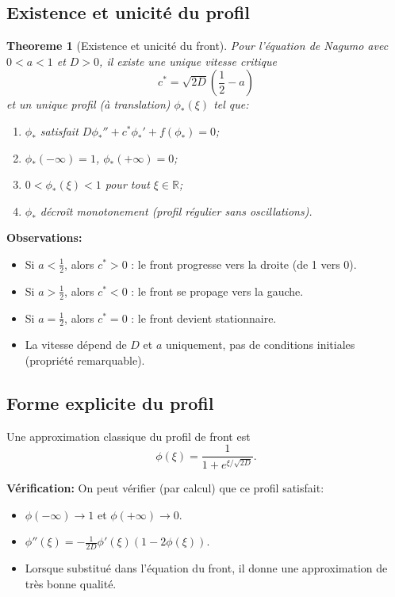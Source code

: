 \documentclass[11pt,a4paper]{report}
\newtheorem{theorem}{Theoreme}[chapter]
\begin{document}
\subsection*{Existence et unicité du profil}
\begin{theorem}[Existence et unicité du front]
Pour l'équation de Nagumo avec $0 < a < 1$ et $D > 0$, il existe une unique
vitesse critique
\begin{equation}
 c^* = \sqrt{2D}\left(\frac{1}{2} - a\right)
\end{equation}
et un unique profil (à translation) $\phi_*(\xi)$ tel que:
\begin{enumerate}[leftmargin=1.5em]
  \item $\phi_*$ satisfait $D\phi_*'' + c^*\phi_*' + f(\phi_*) = 0$;
  \item $\phi_*(-\infty)=1$, $\phi_*(+\infty)=0$;
  \item $0 < \phi_*(\xi) < 1$ pour tout $\xi \in \mathbb{R}$;
  \item $\phi_*$ décroît monotonement (profil régulier sans oscillations).
\end{enumerate}
\end{theorem}

\textbf{Observations:}
\begin{itemize}[leftmargin=1.5em]
  \item Si $a < \tfrac{1}{2}$, alors $c^* > 0$ : le front progresse vers la droite (de 1 vers 0).
  \item Si $a > \tfrac{1}{2}$, alors $c^* < 0$ : le front se propage vers la gauche.
  \item Si $a = \tfrac{1}{2}$, alors $c^* = 0$ : le front devient stationnaire.
  \item La vitesse dépend de $D$ et $a$ uniquement, pas de conditions initiales (propriété remarquable).
\end{itemize}

\subsection*{Forme explicite du profil}
Une approximation classique du profil de front est
\begin{equation}
 \phi(\xi) = \frac{1}{1 + e^{\xi/\sqrt{2D}}}.
\end{equation}

\textbf{Vérification:}
On peut vérifier (par calcul) que ce profil satisfait:
\begin{itemize}[leftmargin=1.5em]
  \item $\phi(-\infty) \to 1$ et $\phi(+\infty) \to 0$.
  \item $\phi''(\xi) = -\frac{1}{2D}\phi'(\xi)(1-2\phi(\xi))$.
  \item Lorsque substitué dans l'équation du front, il donne une approximation de très bonne qualité.
\end{itemize}
\end{document}
